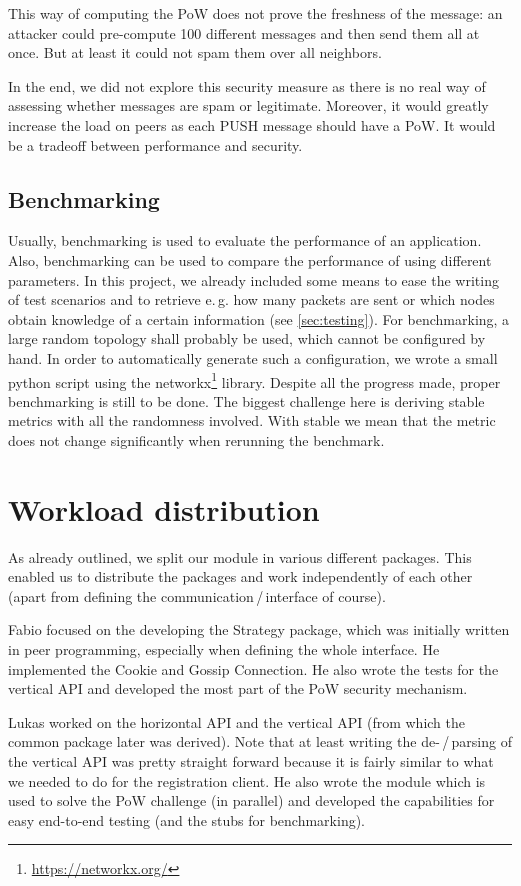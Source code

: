 \documentclass[a4paper,english,10pt,NET]{tumarticle}
\renewcommand{\eg}{\mbox{e.\,g.}\xspace} %
\begin{document}
This way of computing the PoW does not prove the freshness of the message: an attacker could pre-compute 100 different messages and then send them all at once. But at least it could not spam them over all neighbors.

In the end, we did not explore this security measure as there is no real way of assessing whether messages are spam or legitimate. Moreover, it would greatly increase the load on peers as each PUSH message should have a PoW. It would be a tradeoff between performance and security.

\subsection{Benchmarking} \label{fut:benchmarking}
Usually, benchmarking is used to evaluate the performance of an application.
Also, benchmarking can be used to compare the performance of using different parameters.
In this project, we already included some means to ease the writing of test scenarios and to retrieve \eg how many packets are sent or which nodes obtain knowledge of a certain information (see \cref{sec:testing}).
For benchmarking, a large random topology shall probably be used, which cannot be configured by hand.
In order to automatically generate such a configuration, we wrote a small python script using the networkx\footnote{\url{https://networkx.org/}} library.
Despite all the progress made, proper benchmarking is still to be done.
The biggest challenge here is deriving stable metrics with all the randomness involved.
With stable we mean that the metric does not change significantly when rerunning the benchmark.

\section{Workload distribution}
As already outlined, we split our module in various different packages.
This enabled us to distribute the packages and work independently of each other (apart from defining the communication\,/\,interface of course).

Fabio focused on the developing the Strategy package, which was initially written in peer programming, especially when defining the whole interface. He implemented the Cookie and Gossip Connection. He also wrote the tests for the vertical API and developed the most part of the PoW security mechanism.

Lukas worked on the horizontal API and the vertical API (from which the common package later was derived).
Note that at least writing the de-\,/\,parsing of the vertical API was pretty straight forward because it is fairly similar to what we needed to do for the registration client.
He also wrote the module which is used to solve the PoW challenge (in parallel) and developed the capabilities for easy end-to-end testing (and the stubs for benchmarking).
\end{document}
